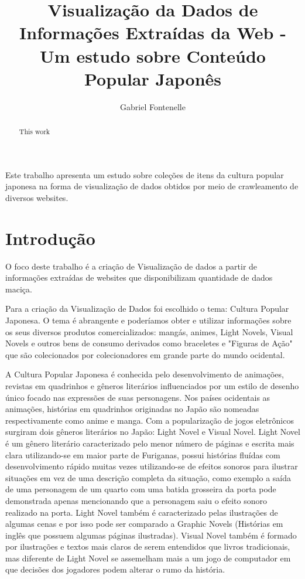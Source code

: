 \documentclass[12pt]{article}
\title{Visualização da Dados de Informações Extraídas da Web - Um estudo sobre Conteúdo Popular Japonês}
\author{Gabriel Fontenelle\inst{1}}
\begin{document}
 
\maketitle

\begin{abstract}

This work 
\end{abstract}
     
\begin{resumo} 


Este trabalho apresenta um estudo sobre coleções de itens da cultura popular japonesa na forma de visualização de dados obtidos por meio de crawleamento de diversos websites.

\end{resumo}


\section{Introdução}

O foco deste trabalho é a criação de Visualização de dados a partir de informações extraídas de websites que disponibilizam quantidade de dados maciça.

Para a criação da Visualização de Dados foi escolhido o tema: Cultura Popular Japonesa. O tema é abrangente e poderíamos obter e utilizar informações sobre os seus diversos produtos comercializados: mangás, animes, Light Novels, Visual Novels e outros bens de consumo derivados como braceletes e "Figuras de Ação" que são colecionados por colecionadores em grande parte do mundo ocidental.

A Cultura Popular Japonesa é conhecida pelo desenvolvimento de animações, revistas em quadrinhos e gêneros literários influenciados por um estilo de desenho único focado nas expressões de suas personagens. Nos países ocidentais as animações, histórias em quadrinhos originadas no Japão são nomeadas respectivamente como anime e manga.
Com a popularização de jogos eletrônicos surgiram dois gêneros literários no Japão: Light Novel e Visual Novel. Light Novel é um gênero literário caracterizado pelo menor número de páginas e escrita mais clara utilizando-se em maior parte de Furiganas, possui histórias fluídas com desenvolvimento rápido muitas vezes utilizando-se de efeitos sonoros para ilustrar situações em vez de uma descrição completa da situação, como exemplo a saída de uma personagem de um quarto com uma batida grosseira da porta pode demonstrada apenas mencionando que a personagem saiu o efeito sonoro realizado na porta. Light Novel também é caracterizado pelas ilustrações de algumas cenas e por isso pode ser comparado a Graphic Novels (Histórias em inglês que possuem algumas páginas ilustradas). Visual Novel também é formado por ilustrações e textos mais claros de serem entendidos que livros tradicionais, mas diferente de Light Novel se assemelham mais a um jogo de computador em que decisões dos jogadores podem alterar o rumo da história.
\end{document}
